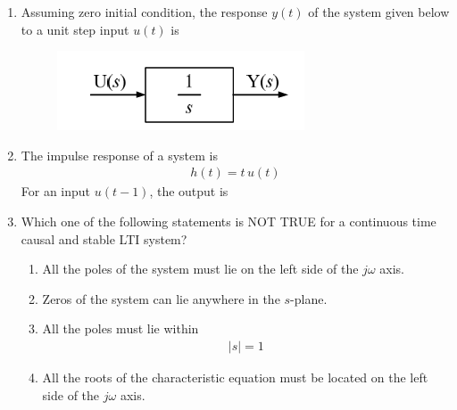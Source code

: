 \documentclass[journal,12pt,onecolumn]{IEEEtran}
\theoremstyle{remark}
\begin{document}
\begin{enumerate}
\item Assuming zero initial condition, the response $y(t)$ of the system given below to a unit step input $u(t)$ is

\begin{figure}[h]
    \centering
    \includegraphics[width=0.5\columnwidth]{figs/3.png}
    \label{fig:placeholder}
\end{figure}

\begin{enumerate}
\end{enumerate}

\item The impulse response of a system is \begin{align*}
    h(t) = t\,u(t)
\end{align*}
For an input $u(t-1)$, the output is

\begin{enumerate}
\end{enumerate}

\item Which one of the following statements is NOT TRUE for a continuous time causal and stable LTI system?

\begin{enumerate}
\item All the poles of the system must lie on the left side of the $j\omega$ axis.  
\item Zeros of the system can lie anywhere in the $s$-plane.  
\item All the poles must lie within 
\begin{align*}
|s|=1
\end{align*}
\item All the roots of the characteristic equation must be located on the left side of the $j\omega$ axis.  
\end{enumerate}



\end{enumerate}
\end{document}
